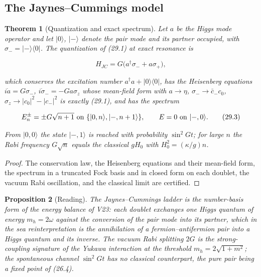 \documentclass[11pt]{article}
\newtheorem{theorem}{Theorem}[section]
\newtheorem{proposition}[theorem]{Proposition}
\theoremstyle{remark}
\begin{document}
\subsection{The Jaynes--Cummings model}

\begin{theorem}[Quantization and exact spectrum]
\label{thm:v20v26-jc}
Let \(a\) be the Higgs mode operator and let \(|0\rangle\), \(|-\rangle\)
denote the pair mode and its partner occupied, with
\(\sigma_-=|-\rangle\langle0|\).  The quantization of (29.1) at exact
resonance is

\[
 H_{JC}=G\bigl(a^\dagger\sigma_-+a\sigma_+\bigr),                      \tag{29.2}
\]

which conserves the excitation number \(a^\dagger a+|0\rangle\langle0|\),
has the Heisenberg equations \(i\dot a=G\sigma_-\),
\(i\dot\sigma_-=-Ga\sigma_z\) whose mean-field form with
\(a\to\eta\), \(\sigma_-\to\bar c_-c_0\), \(\sigma_z\to|c_0|^2-|c_-|^2\)
is exactly (29.1), and has the spectrum

\[
 E^\pm_n=\pm G\sqrt{n+1}\ \hbox{on}\ \{|0,n\rangle,|-,n+1\rangle\},\qquad
 E=0\ \hbox{on}\ |-,0\rangle.                                          \tag{29.3}
\]

From \(|0,0\rangle\) the state \(|-,1\rangle\) is reached with
probability \(\sin^2Gt\); for large \(n\) the Rabi frequency
\(G\sqrt n\) equals the classical \(gH_0\) with \(H_0^2=(\kappa/g)n\).
\end{theorem}

\begin{proof}
The conservation law, the Heisenberg equations and their mean-field
form, the spectrum in a truncated Fock basis and in closed form on
each doublet, the vacuum Rabi oscillation, and the classical limit
are certified.
\end{proof}

\begin{proposition}[Reading]
\label{prop:v20v26-reading}
The Jaynes--Cummings ladder is the number-basis form of the energy
balance of V23: each doublet exchanges one Higgs quantum of energy
\(m_h=2\omega\) against the conversion of the pair mode into its
partner, which in the sea reinterpretation is the annihilation of a
fermion--antifermion pair into a Higgs quantum and its inverse.  The
vacuum Rabi splitting \(2G\) is the strong-coupling signature of the
Yukawa interaction at the threshold \(m_h=2\sqrt{1+m^2}\); the
spontaneous channel \(\sin^2Gt\) has no classical counterpart, the
pure pair being a fixed point of (26.4).
\end{proposition}
\end{document}

